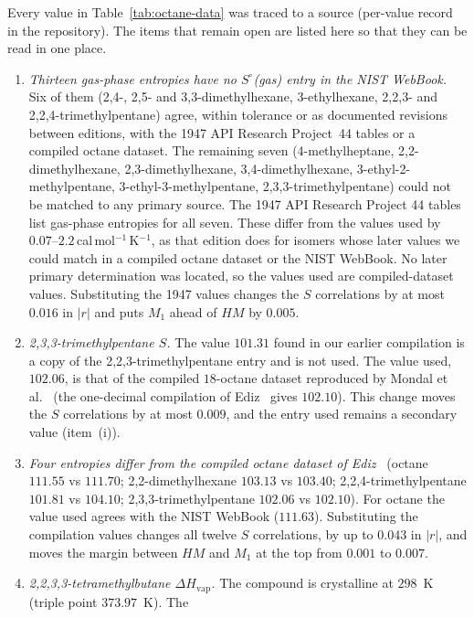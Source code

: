 \documentclass[a5paper, 10pt]{article}
\theoremstyle{plain}
\theoremstyle{remark}
\theoremstyle{definition}
\begin{document}
Every value in Table~\ref{tab:octane-data} was traced to a source
(per-value record in the repository). The items that remain
open are listed here so that they can be read in one place.
\begin{enumerate}[label=(\roman*)]
\item \emph{Thirteen gas-phase entropies have no $S^{\circ}$(gas) entry
  in the NIST WebBook.} Six of them (2,4-, 2,5- and
  3,3-dimethylhexane, 3-ethylhexane, 2,2,3- and 2,2,4-trimethylpentane)
  agree, within tolerance or as documented revisions between editions,
  with the 1947 API Research Project~44 tables or a compiled octane
  dataset. The remaining seven (4-methylheptane, 2,2-dimethylhexane,
  2,3-dimethylhexane, 3,4-dimethylhexane, 3-ethyl-2-methylpentane, 3-ethyl-3-methylpentane,
  2,3,3-trimethylpentane) could not be matched to any primary source. The 1947 API Research Project 44
  tables~\cite{APIProject44Circ461} list gas-phase entropies for all seven.
  These differ from the values used by $0.07$--$2.2$\,cal\,mol$^{-1}$\,K$^{-1}$,
  as that edition does for isomers whose later values we could match in a compiled octane dataset or the NIST WebBook. No later primary determination was located, so the values used
  are compiled-dataset values. Substituting the 1947 values changes the
  $S$ correlations by at most $0.016$ in $|r|$ and puts $M_1$ ahead of
  $HM$ by $0.005$.
\item \emph{2,3,3-trimethylpentane $S$.} The value $101.31$ found in our
  earlier compilation is a copy of the 2,2,3-trimethylpentane entry and is
  not used. The value used, $102.06$, is that of the compiled
  $18$-octane dataset reproduced by Mondal et al.~\cite{MondalDePal2019QSPR}
  (the one-decimal compilation of Ediz~\cite{Ediz2017Octane} gives
  $102.10$). This change moves the $S$ correlations by at most $0.009$, and the
  entry used remains a secondary value (item~(i)).
\item \emph{Four entropies differ from the compiled octane dataset of
  Ediz~\cite{Ediz2017Octane}} (octane $111.55$ vs $111.70$;
  2,2-dimethylhexane $103.13$ vs $103.40$; 2,2,4-trimethylpentane $101.81$
  vs $104.10$; 2,3,3-trimethylpentane $102.06$ vs $102.10$). For octane
  the value used agrees with the NIST WebBook ($111.63$). Substituting the
  compilation values changes all twelve $S$ correlations, by up to $0.043$
  in $|r|$, and moves the margin between $HM$ and $M_1$ at the top from
  $0.001$ to $0.007$.
\item \emph{2,2,3,3-tetramethylbutane $\Delta H_{\mathrm{vap}}$.} The
  compound is crystalline at $298$~K (triple point $373.97$~K). The

\end{enumerate}
\end{document}
